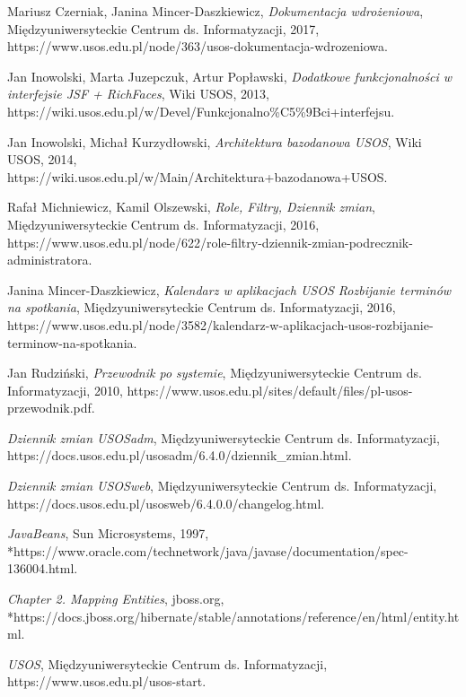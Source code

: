 \documentclass[licencjacka]{pracamgr}
\begin{document}
\begin{thebibliography}{99}


 Mariusz Czerniak, Janina Mincer-Daszkiewicz, \textit{Dokumentacja wdrożeniowa}, Międzyuniwersyteckie Centrum ds. Informatyzacji, 2017, https://www.usos.edu.pl/node/363/usos-dokumentacja-wdrozeniowa.

 Jan Inowolski, Marta Juzepczuk, Artur Popławski, \textit{Dodatkowe funkcjonalności w interfejsie JSF + RichFaces}, Wiki USOS, 2013, https://wiki.usos.edu.pl/w/Devel/Funkcjonalno\%C5\%9Bci+interfejsu.
 	
 Jan Inowolski, Michał Kurzydłowski, \textit{Architektura bazodanowa USOS}, Wiki USOS, 2014, https://wiki.usos.edu.pl/w/Main/Architektura+bazodanowa+USOS.

 Rafał Michniewicz, Kamil Olszewski, \textit{Role, Filtry, Dziennik zmian}, Międzyuniwersyteckie Centrum ds. Informatyzacji, 2016, https://www.usos.edu.pl/node/622/role-filtry-dziennik-zmian-podrecznik-administratora.

 Janina Mincer-Daszkiewicz, \textit{Kalendarz w aplikacjach USOS Rozbijanie terminów na spotkania}, Międzyuniwersyteckie Centrum ds. Informatyzacji, 2016, https://www.usos.edu.pl/node/3582/kalendarz-w-aplikacjach-usos-rozbijanie-terminow-na-spotkania.

 Jan Rudziński, \textit{Przewodnik po systemie}, Międzyuniwersyteckie Centrum ds. Informatyzacji, 2010, https://www.usos.edu.pl/sites/default/files/pl-usos-przewodnik.pdf.

 \textit{Dziennik zmian USOSadm}, Międzyuniwersyteckie Centrum ds. Informatyzacji, https://docs.usos.edu.pl/usosadm/6.4.0/dziennik\_zmian.html.

 \textit{Dziennik zmian USOSweb}, Międzyuniwersyteckie Centrum ds. Informatyzacji, https://docs.usos.edu.pl/usosweb/6.4.0.0/changelog.html.

 \textit{JavaBeans}, Sun Microsystems, 1997,\\*https://www.oracle.com/technetwork/java/javase/documentation/spec-136004.html.

 \textit{Chapter 2. Mapping Entities}, jboss.org,\\*https://docs.jboss.org/hibernate/stable/annotations/reference/en/html/entity.html.

 \textit{USOS}, Międzyuniwersyteckie Centrum ds. Informatyzacji, https://www.usos.edu.pl/usos-start.

\end{thebibliography}
\end{document}
